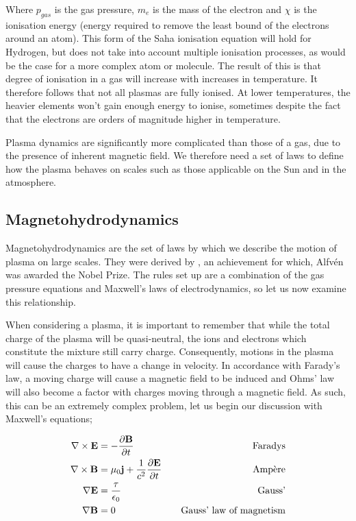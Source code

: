 Where $p_{gas}$ is the gas pressure, $m_e$ is the mass of the electron and $\chi$ is the ionisation energy (energy required to remove the least bound of the electrons around an atom).
This form of the Saha ionisation equation will hold for Hydrogen, but does not take into account multiple ionisation processes, as would be the case for a more complex atom or molecule.
The result of this is that degree of ionisation in a gas will increase with increases in temperature.
It therefore follows that not all plasmas are fully ionised.
At lower temperatures, the heavier elements won't gain enough energy to ionise, sometimes despite the fact that the electrons are orders of magnitude higher in temperature.

Plasma dynamics are significantly more complicated than those of a gas, due to the presence of inherent magnetic field. 
We therefore need a set of laws to define how the plasma behaves on scales such as those applicable on the Sun and in the atmosphere.


\subsection{Magnetohydrodynamics}

Magnetohydrodynamics are the set of laws by which we describe the motion of plasma on large scales.
They were derived by \cite{Alfven1942}, an achievement for which, Alfv{\'e}n was awarded the Nobel Prize.
The rules set up are a combination of the gas pressure equations and Maxwell's laws of electrodynamics, so let us now examine this relationship.

When considering a plasma, it is important to remember that while the total charge of the plasma will be quasi-neutral, the ions and electrons which constitute the mixture still carry charge.
Consequently, motions in the plasma will cause the charges to have a change in velocity.
In accordance with Farady's law, a moving charge will cause a magnetic field to be induced and Ohms' law will also become a factor with charges moving through a magnetic field.
As such, this can be an extremely complex problem, let us begin our discussion with Maxwell's equations;

\begin{align}
	\nabla \times \mathbf{E} &= -\frac{\partial \mathbf{B}}{\partial t }  &\quad \textnormal{Faradys}\\
	\nabla \times \mathbf{B} &= \mu_0\mathbf{j} + \frac{1}{c^2}\frac{\partial \mathbf{E}}{\partial t } &\quad \textnormal{Amp{\`e}re}\\
	\nabla\mathbf{E} &= \frac{\tau}{\epsilon_0} &\quad \textnormal{Gauss'}\\
	\nabla\mathbf{B} &= 0 & \quad \textnormal{Gauss' law of magnetism}\\
\end{align}

